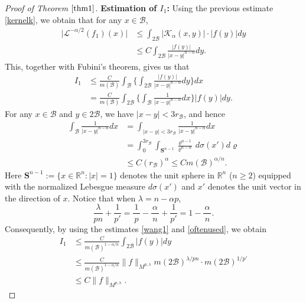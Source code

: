 \documentclass[10pt, reqno]{amsart}
\theoremstyle{definition}
\theoremstyle{remark}
\numberwithin{equation}{section}
\begin{document}
\begin{proof}[Proof of Theorem $\ref{thm1}$]
\textbf{Estimation of $I_1$:} Using the previous estimate \eqref{kernelk}, we obtain that for any $x\in \mathcal{B}$,
\begin{equation*}
\begin{split}
\big|\mathcal{L}^{-\alpha/2}(f_1)(x)\big|&\leq\int_{2\mathcal{B}}\big|\mathcal K_{\alpha}(x,y)\big|\cdot|f(y)|dy\\
&\leq C\int_{2\mathcal{B}}\frac{|f(y)|}{|x-y|^{n-\alpha}}dy.
\end{split}
\end{equation*}
This, together with Fubini's theorem, gives us that
\begin{equation*}
\begin{split}
I_1&\leq\frac{C}{m(\mathcal{B})}\int_{\mathcal{B}}\bigg\{\int_{2\mathcal{B}}\frac{|f(y)|}{|x-y|^{n-\alpha}}dy\bigg\}dx\\
&=\frac{C}{m(\mathcal{B})}\int_{2\mathcal{B}}\bigg\{\int_{\mathcal{B}}\frac{1}{|x-y|^{n-\alpha}}dx\bigg\}|f(y)|dy.
\end{split}
\end{equation*}
For any $x\in \mathcal{B}$ and $y\in 2\mathcal{B}$, we have $|x-y|<3r_{\mathcal{B}}$, and hence
\begin{equation}\label{wang1}
\begin{split}
\int_{\mathcal{B}}\frac{1}{|x-y|^{n-\alpha}}dx&=\int_{|x-y|<3r_{\mathcal{B}}}\frac{1}{|x-y|^{n-\alpha}}dx\\
&=\int_0^{3r_{\mathcal{B}}}\int_{\mathbf{S}^{n-1}}\frac{\varrho^{n-1}}{\varrho^{n-\alpha}}\,d\sigma(x')d\varrho\\
&\leq C(r_{\mathcal{B}})^{\alpha}\leq Cm(\mathcal{B})^{\alpha/n}.
\end{split}
\end{equation}
Here $\mathbf{S}^{n-1}:=\{x\in\mathbb R^n:|x|=1\}$ denotes the unit sphere in $\mathbb R^n$ ($n\geq2$) equipped with the normalized Lebesgue measure $d\sigma(x')$ and $x'$ denotes the unit vector in the direction of $x$.
Notice that when $\lambda=n-\alpha p$,
\begin{equation}\label{cal1}
\frac{\lambda}{pn}+\frac{1}{p'}=\frac{\,1\,}{p}-\frac{\alpha}{\,n\,}+\frac{1}{p'}=1-\frac{\alpha}{\,n\,}.
\end{equation}
Consequently, by using the estimates \eqref{wang1} and \eqref{oftenused}, we obtain
\begin{equation*}
\begin{split}
I_1&\leq\frac{C}{m(\mathcal{B})^{1-\alpha/n}}\int_{2\mathcal{B}}|f(y)|dy\\
&\leq\frac{C}{m(\mathcal{B})^{1-\alpha/n}}\big\|f\big\|_{M^{p,\lambda}}m(2\mathcal{B})^{\lambda/{pn}}\cdot m(2\mathcal{B})^{1/{p'}}\\
&\leq C\big\|f\big\|_{M^{p,\lambda}}.
\end{split}
\end{equation*}


\end{proof}
\end{document}
